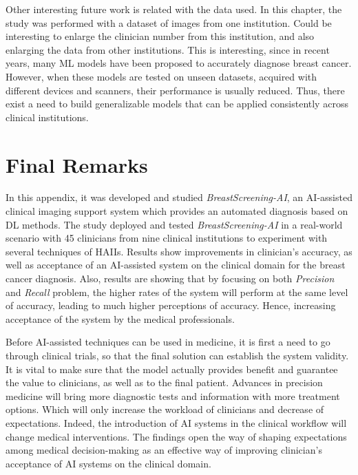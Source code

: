 Other interesting future work is related with the data used. 
In this chapter, the study was performed with a dataset of images from one institution.
Could be interesting to enlarge the clinician number from this institution, and also enlarging the data from other institutions.
This is interesting, since in recent years, many \ac{ML} models have been proposed to accurately diagnose breast cancer.
However, when these models are tested on unseen datasets, acquired with different devices and scanners, their performance is usually reduced.
Thus, there exist a need to build generalizable models that can be applied consistently across clinical institutions.

\section{Final Remarks}
\label{sec:app003006}

In this appendix, it was developed and studied {\it BreastScreening-AI}, an \ac{AI}-assisted clinical imaging support system which provides an automated diagnosis based on \ac{DL} methods.
The study deployed and tested {\it BreastScreening-AI} in a real-world scenario with 45 clinicians from nine clinical institutions to experiment with several techniques of \acp{HAII}.
Results show improvements in clinician’s accuracy, as well as acceptance of an \ac{AI}-assisted system on the clinical domain for the breast cancer diagnosis.
Also, results are showing that by focusing on both {\it Precision} and {\it Recall} problem, the higher rates of the system will perform at the same level of accuracy, leading to much higher perceptions of accuracy.
Hence, increasing acceptance of the system by the medical professionals.

Before \ac{AI}-assisted techniques can be used in medicine, it is first a need to go through clinical trials, so that the final solution can establish the system validity.
It is vital to make sure that the model actually provides benefit and guarantee the value to clinicians, as well as to the final patient.
Advances in precision medicine will bring more diagnostic tests and information with more treatment options.
Which will only increase the workload of clinicians and decrease of expectations.
Indeed, the introduction of \ac{AI} systems in the clinical workflow will change medical interventions.
The findings open the way of shaping expectations among medical decision-making as an effective way of improving clinician’s acceptance of \ac{AI} systems on the clinical domain.